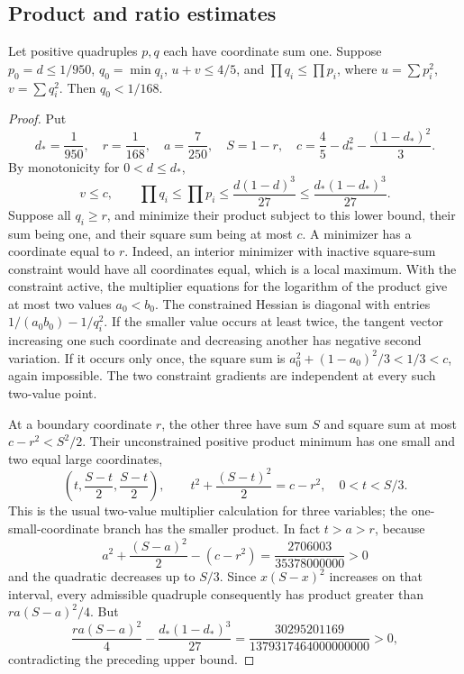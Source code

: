 \subsection{Product and ratio estimates}

\begin{lemma}\label{lem:three-largest-product}
Let positive quadruples $p,q$ each have coordinate sum one. Suppose
$p_0=d\le1/950$, $q_0=\min q_i$, $u+v\le4/5$, and
$\prod q_i\le\prod p_i$, where $u=\sum p_i^2$, $v=\sum q_i^2$.
Then $q_0<1/168$.
\end{lemma}
\begin{proof}
Put
\[
 d_*=\frac1{950},\quad r=\frac1{168},\quad a=\frac7{250},
 \quad S=1-r,\quad
 c=\frac45-d_*^2-\frac{(1-d_*)^2}{3}.
\]
By monotonicity for $0<d\le d_*$,
\[
 v\le c,\qquad
 \prod q_i\le\prod p_i\le\frac{d(1-d)^3}{27}
 \le\frac{d_*(1-d_*)^3}{27}.
\]
Suppose all $q_i\ge r$, and minimize their product subject to this
lower bound, their sum being one, and their square sum being at most
$c$. A minimizer has a coordinate equal to $r$. Indeed, an interior
minimizer with inactive square-sum constraint would have all coordinates
equal, which is a local maximum. With the constraint active, the
multiplier equations for the logarithm of the product give at most
two values $a_0<b_0$. The constrained Hessian is diagonal with entries
$1/(a_0b_0)-1/q_i^2$. If the smaller value occurs at least twice, the tangent
vector increasing one such coordinate and decreasing another has
negative second variation. If it occurs only once, the square sum is
$a_0^2+(1-a_0)^2/3<1/3<c$, again impossible. The two constraint
gradients are independent at every such two-value point.

At a boundary coordinate $r$, the other three have sum $S$ and square
sum at most $c-r^2<S^2/2$. Their unconstrained positive product minimum
has one small and two equal large coordinates,
\[
 \left(t,\frac{S-t}{2},\frac{S-t}{2}\right),\qquad
 t^2+\frac{(S-t)^2}{2}=c-r^2,\quad 0<t<S/3.
\]
This is the usual two-value multiplier calculation for three variables;
the one-small-coordinate branch has the smaller product.
In fact $t>a>r$, because
\[
 a^2+\frac{(S-a)^2}{2}-(c-r^2)
 =\frac{2706003}{35378000000}>0
\]
and the quadratic decreases up to $S/3$. Since $x(S-x)^2$ increases
on that interval, every admissible quadruple consequently has product
greater than $ra(S-a)^2/4$. But
\[
 \frac{ra(S-a)^2}{4}-\frac{d_*(1-d_*)^3}{27}
 =\frac{30295201169}{1379317464000000000}>0,
\]
contradicting the preceding upper bound.
\end{proof}

